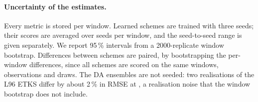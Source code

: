 \paragraph{Uncertainty of the estimates.}
Every metric is stored per window. Learned schemes are trained with three seeds; their
scores are averaged over seeds per window, and the seed-to-seed range is given
separately. We report 95\,\% intervals from a 2000-replicate window bootstrap.
Differences between schemes are paired, by bootstrapping the per-window differences,
since all schemes are scored on the same windows, observations and draws. The DA
ensembles are not seeded: two realisations of the L96 ETKS differ by about 2\,\% in RMSE at
\Sz{}, a realisation noise that the window bootstrap does not include.
